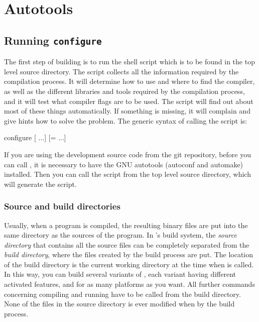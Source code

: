 \section{Autotools}
\subsection{Running \texttt{configure}}
\label{sec:configure}

The first step of building \es is to run the shell script
 which is to be found in the top level source
directory.  The script collects all the information required by the
compilation process.  It will determine how to use and where to find
the compiler, as well as the different libraries and tools required by
the compilation process, and it will test what compiler flags are to
be used.  The script will find out about most of these things
automatically.  If something is missing, it will complain and give
hints how to solve the problem.  The generic syntax of calling the
 script is:
\begin{code}
configure [ ...] [= ...]
\end{code}

If you are using the development source code from the \textsf{git}
repository, before you can call , it is necessary
to have the GNU autotools (\textsf{autoconf} and \textsf{automake})
installed.  Then you can call the script  from
the top level source directory, which will generate the
 script.

\subsubsection{Source and build directories}
\label{ssec:builddir}
 

Usually, when a program is compiled, the resulting binary files are
put into the same directory as the sources of the program.  In \es's
build system, the \emph{source directory} that contains all the source
files can be completely separated from the \emph{build directory},
where the files created by the build process are put.  The location of
the build directory is the current working directory at the time when
 is called.  In this way, you can build several
variants of \es, each variant having different activated features, and
for as many platforms as you want.  All further commands concerning
compiling and running \es have to be called from the build directory.
None of the files in the source directory is ever modified when by the
build process.

